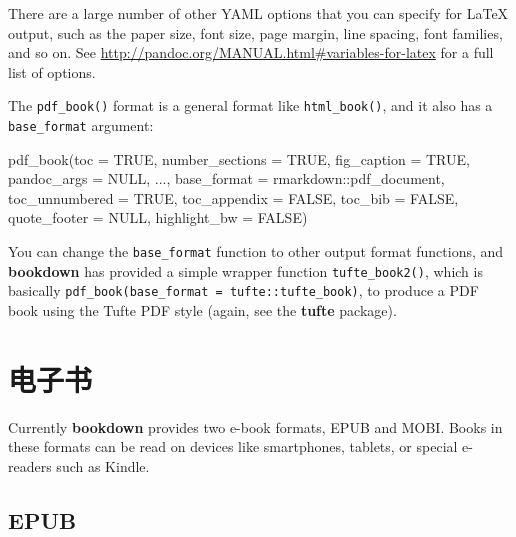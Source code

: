 \documentclass[
  12pt,
]{krantz}
\newenvironment{Shaded}{\begin{snugshade}}{\end{snugshade}}
\newcommand{\AttributeTok}[1]{\textcolor[rgb]{0.77,0.63,0.00}{#1}}
\newcommand{\ConstantTok}[1]{\textcolor[rgb]{0.00,0.00,0.00}{#1}}
\newcommand{\FunctionTok}[1]{\textcolor[rgb]{0.00,0.00,0.00}{#1}}
\newcommand{\NormalTok}[1]{#1}
\newcommand{\SpecialCharTok}[1]{\textcolor[rgb]{0.00,0.00,0.00}{#1}}
\theoremstyle{definition}
\theoremstyle{definition}
\theoremstyle{definition}
\theoremstyle{definition}
\theoremstyle{remark}
\begin{document}
There are a large number of other YAML options that you can specify for LaTeX output, such as the paper size, font size, page margin, line spacing, font families, and so on. See \url{http://pandoc.org/MANUAL.html\#variables-for-latex} for a full list of options.

The \texttt{pdf\_book()} format is a general format like \texttt{html\_book()}, and it also has a \texttt{base\_format} argument:

\begin{Shaded}
\begin{Highlighting}[]
\FunctionTok{pdf\_book}\NormalTok{(}\AttributeTok{toc =} \ConstantTok{TRUE}\NormalTok{, }\AttributeTok{number\_sections =} \ConstantTok{TRUE}\NormalTok{,}
  \AttributeTok{fig\_caption =} \ConstantTok{TRUE}\NormalTok{, }\AttributeTok{pandoc\_args =} \ConstantTok{NULL}\NormalTok{, ...,}
  \AttributeTok{base\_format =}\NormalTok{ rmarkdown}\SpecialCharTok{::}\NormalTok{pdf\_document,}
  \AttributeTok{toc\_unnumbered =} \ConstantTok{TRUE}\NormalTok{, }\AttributeTok{toc\_appendix =} \ConstantTok{FALSE}\NormalTok{,}
  \AttributeTok{toc\_bib =} \ConstantTok{FALSE}\NormalTok{, }\AttributeTok{quote\_footer =} \ConstantTok{NULL}\NormalTok{,}
  \AttributeTok{highlight\_bw =} \ConstantTok{FALSE}\NormalTok{)}
\end{Highlighting}
\end{Shaded}

You can change the \texttt{base\_format} function to other output format functions, and \textbf{bookdown} has provided a simple wrapper function \texttt{tufte\_book2()}, which is basically \texttt{pdf\_book(base\_format\ =\ tufte::tufte\_book)}, to produce a PDF book using the Tufte PDF style (again, see the \textbf{tufte} package).

\hypertarget{ux7535ux5b50ux4e66}{%
\section{电子书}\label{ux7535ux5b50ux4e66}}

Currently \textbf{bookdown} provides two e-book formats, EPUB and MOBI. Books in these formats can be read on devices like smartphones, tablets, or special e-readers such as Kindle.

\hypertarget{epub}{%
\subsection{EPUB}\label{epub}}
\end{document}
